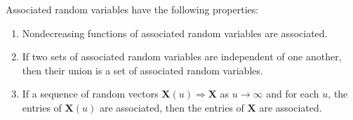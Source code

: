 \documentclass[sigconf]{acmart}
\newcommand{\tod}{\Rightarrow}
\begin{document}
\begin{lemma}\label{lem:association}
Associated random variables have the following properties:
\begin{enumerate}[label=(P\arabic*),leftmargin=3em]
\item Nondecreasing functions of associated random variables are associated.
\item If two sets of associated random variables are independent of one another, then their union is a set of associated random variables.
\item If a sequence of random vectors $\bm{X}(u)\tod \bm{X}$ as $u\to\infty$ and for each $u$, the entries of $\bm{X}(u)$ are associated, then the entries of $\bm{X}$ are associated.
\end{enumerate}
\end{lemma}
\end{document}

